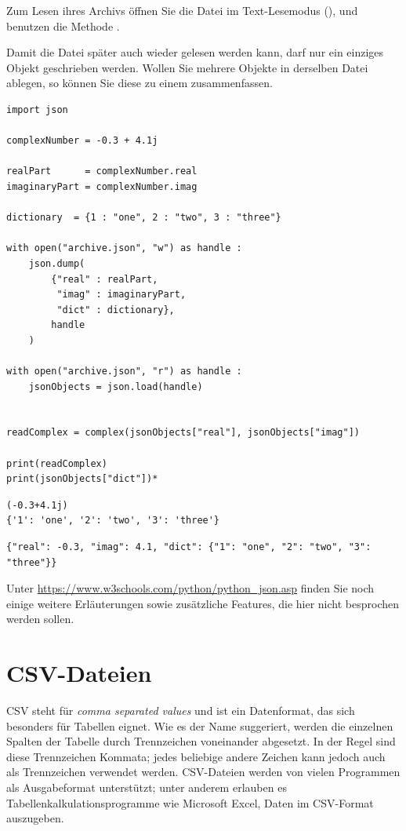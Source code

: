 Zum Lesen ihres Archivs öffnen Sie die Datei im Text-Lesemodus (), und benutzen die Methode .

Damit die Datei später auch wieder gelesen werden kann, darf nur ein einziges Objekt geschrieben werden. Wollen Sie mehrere Objekte in derselben Datei ablegen, so können Sie diese zu einem  zusammenfassen.

\begin{codebox}
\begin{verbatim}
import json

complexNumber = -0.3 + 4.1j

realPart      = complexNumber.real
imaginaryPart = complexNumber.imag

dictionary  = {1 : "one", 2 : "two", 3 : "three"}

with open("archive.json", "w") as handle :
    json.dump(
        {"real" : realPart,
         "imag" : imaginaryPart,
         "dict" : dictionary},
        handle
    )
    
with open("archive.json", "r") as handle :
    jsonObjects = json.load(handle)
    

readComplex = complex(jsonObjects["real"], jsonObjects["imag"])

print(readComplex)
print(jsonObjects["dict"])*
\end{verbatim}
\end{codebox}

\begin{cmdbox}
\begin{verbatim}
(-0.3+4.1j)
{'1': 'one', '2': 'two', '3': 'three'}
\end{verbatim}
\end{cmdbox}

\begin{cmdbox}
\begin{verbatim}
{"real": -0.3, "imag": 4.1, "dict": {"1": "one", "2": "two", "3": "three"}}
\end{verbatim}
\end{cmdbox}

Unter \url{https://www.w3schools.com/python/python_json.asp} finden Sie noch einige weitere Erläuterungen sowie zusätzliche Features, die hier nicht besprochen werden sollen.

\section{CSV-Dateien}
CSV steht für \emph{comma separated values} und ist ein Datenformat, das sich besonders für Tabellen eignet. Wie es der Name suggeriert, werden die einzelnen Spalten der Tabelle durch Trennzeichen voneinander abgesetzt. In der Regel sind diese Trennzeichen Kommata; jedes beliebige andere Zeichen kann jedoch auch als Trennzeichen verwendet werden. CSV-Dateien werden von vielen Programmen als Ausgabeformat unterstützt; unter anderem erlauben es Tabellenkalkulationsprogramme wie Microsoft Excel, Daten im CSV-Format auszugeben.

